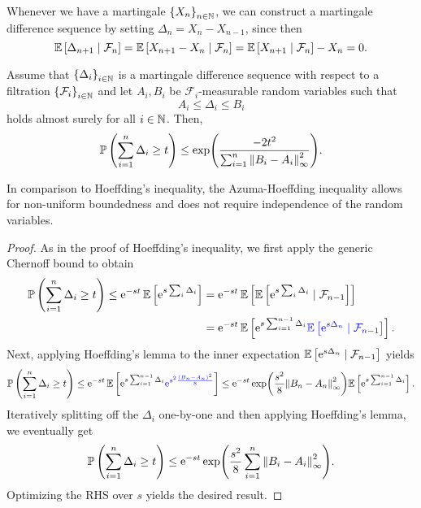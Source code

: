 Whenever we have a martingale $\left\{X_n\right\}_{n\in\mathbb{N}}$, we can construct a martingale difference sequence by setting $\Delta_n = X_n - X_{n-1}$, since then
\[
    \mathbb{E}\left[\Delta_{n+1} \mathrel{|} \mathcal{F}_n\right] = \mathbb{E}\left[X_{n+1} - X_n \mathrel{|} \mathcal{F}_n\right] = \mathbb{E}\left[X_{n+1} \mathrel{|} \mathcal{F}_n\right] - X_n = 0.
\]

\begin{theorem}
\label{thm: azuma-hoeffding}
Assume that $\left\{\Delta_i\right\}_{i\in\mathbb{N}}$ is a martingale difference sequence with respect to a filtration $\left\{\mathcal{F}_i\right\}_{i\in\mathbb{N}}$ and let $A_i, B_i$ be $\mathcal{F}_i$-measurable random variables such that
\[
    A_i \leq \Delta_i \leq B_i
\]
holds almost surely for all $i \in \mathbb{N}$. Then,
\[
    \mathbb{P}\left(\sum_{i=1}^n \Delta_i \geq t\right) \leq \exp(\frac{-2t^2}{\sum_{i=1}^n \norm{B_i - A_i}_\infty^2}).
\]
\end{theorem}

In comparison to Hoeffding’s inequality, the Azuma-Hoeffding inequality allows for non-uniform boundedness and does not require independence of the random variables.

\begin{proof}
As in the proof of Hoeffding's inequality, we first apply the generic Chernoff bound to obtain
\begin{align*}
    \mathbb{P}\left(\sum_{i=1}^n \Delta_i \geq t\right) \leq \mathrm{e}^{-st} \, \mathbb{E}\left[\mathrm{e}^{s\sum_i \Delta_i}\right] &= \mathrm{e}^{-st} \, \mathbb{E}\left[\mathbb{E}\left[\mathrm{e}^{s\sum_i \Delta_i} \mathrel{|} \mathcal{F}_{n-1}\right]\right] \\
        &= \mathrm{e}^{-st} \, \mathbb{E}\left[\mathrm{e}^{s\sum_{i=1}^{n-1} \Delta_i} {\color{blue} \mathbb{E}\left[\mathrm{e}^{s\Delta_n} \mathrel{|} \mathcal{F}_{n-1}\right]}\right].
\end{align*}
Next, applying Hoeffding's lemma to the inner expectation $\mathbb{E}\left[\mathrm{e}^{s\Delta_n} \mathrel{|} \mathcal{F}_{n-1}\right]$ yields
\[
    \mathbb{P}\left(\sum_{i=1}^n \Delta_i \geq t\right) \leq \mathrm{e}^{-st} \, \mathbb{E}\left[\mathrm{e}^{s\sum_{i=1}^{n-1} \Delta_i} {\color{blue} \mathrm{e}^{s^2\frac{(B_n - A_n)^2}{8}}}\right] \leq \mathrm{e}^{-st} \exp(\frac{s^2}{8}\norm{B_n - A_n}^2_\infty) \mathbb{E}\left[\mathrm{e}^{s\sum_{i=1}^{n-1} \Delta_i}\right].
\]
Iteratively splitting off the $\Delta_i$ one-by-one and then applying Hoeffding's lemma, we eventually get
\[
    \mathbb{P}\left(\sum_{i=1}^n \Delta_i \geq t\right) \leq \mathrm{e}^{-st} \exp(\frac{s^2}{8}\sum_{i=1}^n \norm{B_i - A_i}_\infty^2).
\]
Optimizing the RHS over $s$ yields the desired result.
\end{proof}
